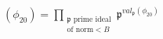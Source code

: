 \documentclass[preview]{standalone}
\begin{document}
\begin{align*}
(\phi_{20}) = \prod_{\substack{\mathfrak{p} \text{ prime ideal} \\ \text{of norm} < B}} \mathfrak{p}^{val_{\mathfrak{p}}(\phi_{20})}
\end{align*}
\end{document}
